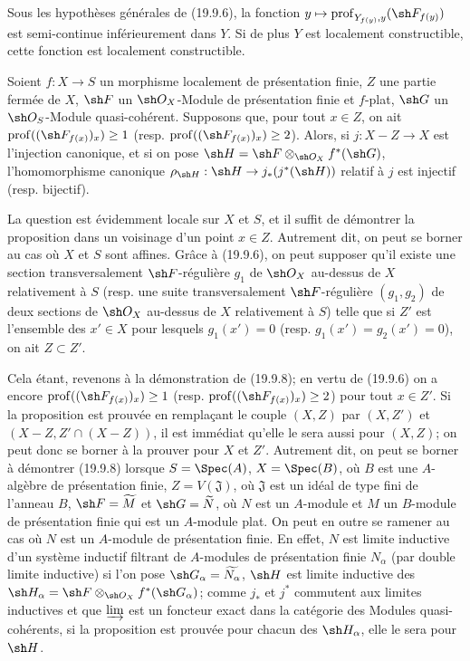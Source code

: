 
\begin{corollary}[19.9.7]
\label{IV.19.9.7}
Sous les hypothèses générales de (19.9.6), la fonction $y\mapsto\operatorname{prof}_{Y_{f(y)},y}(\sh F_{f(y)})$ est semi-continue inférieurement dans $Y$. Si de plus $Y$ est localement constructible, cette fonction est localement constructible.
\end{corollary}

\begin{proposition}[19.9.8]
\label{IV.19.9.8}
Soient $f:X\to S$ un morphisme localement de présentation finie, $Z$ une partie fermée de $X$, $\sh F$ un $\sh O_X$-Module de présentation finie et $f$-plat, $\sh G$ un $\sh O_S$-Module quasi-cohérent. Supposons que, pour tout $x\in Z$, on ait $\operatorname{prof}((\sh F_{f(x)})_x)\geq1$ (resp. $\operatorname{prof}((\sh F_{f(x)})_x)\geq2$). Alors, si $j:X-Z\to X$ est l'injection canonique, et si on pose $\sh H=\sh F\otimes_{\sh O_X}f^*(\sh G)$, l'homomorphisme canonique $\rho_{\sh H}:\sh H\to j_*(j^*(\sh H))$ relatif à $j$ est injectif (resp. bijectif).
\end{proposition}

La question est évidemment locale sur $X$ et $S$, et il suffit de démontrer la proposition dans un voisinage d'un point $x\in Z$. Autrement dit, on peut se borner au cas où $X$ et $S$ sont affines. Grâce à (19.9.6), on peut supposer qu'il existe une section transversalement $\sh F$-régulière $g_1$ de $\sh O_X$ au-dessus de $X$ relativement à $S$ (resp. une suite transversalement $\sh F$-régulière $(g_1,g_2)$ de deux sections de $\sh O_X$ au-dessus de $X$ relativement à $S$) telle que si $Z'$ est l'ensemble des $x'\in X$ pour lesquels $g_1(x')=0$ (resp. $g_1(x')=g_2(x')=0$), on ait $Z\subset Z'$.

Cela étant, revenons à la démonstration de (19.9.8); en vertu de (19.9.6) on a encore $\operatorname{prof}((\sh F_{f(x)})_x)\geq1$ (resp. $\operatorname{prof}((\sh F_{f(x)})_x)\geq2$) pour tout $x\in Z'$. Si la proposition est prouvée en remplaçant le couple $(X,Z)$ par $(X,Z')$ et $(X-Z,Z'\cap(X-Z))$, il est immédiat qu'elle le sera aussi pour $(X,Z)$; on peut donc se borner à la prouver pour $X$ et $Z'$. Autrement dit, on peut se borner à démontrer (19.9.8) lorsque $S=\Spec(A)$, $X=\Spec(B)$, où $B$ est une $A$-algèbre de présentation finie, $Z=V(\mathfrak J)$, où $\mathfrak J$ est un idéal de type fini de l'anneau $B$, $\sh F=\widetilde M$ et $\sh G=\widetilde N$, où $N$ est un $A$-module et $M$ un $B$-module de présentation finie qui est un $A$-module plat. On peut en outre se ramener au cas où $N$ est un $A$-module de présentation finie. En effet, $N$ est limite inductive d'un système inductif filtrant de $A$-modules de présentation finie $N_\alpha$ (par double limite inductive) si l'on pose $\sh G_\alpha=\widetilde{N_\alpha}$, $\sh H$ est limite inductive des $\sh H_\alpha=\sh F\otimes_{\sh O_X}f^*(\sh G_\alpha)$; comme $j_*$ et $j^*$ commutent aux limites inductives et que $\varinjlim$ est un foncteur exact dans la catégorie des Modules quasi-cohérents, si la proposition est prouvée pour chacun des $\sh H_\alpha$, elle le sera pour $\sh H$.

